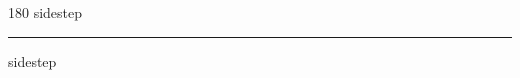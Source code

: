 
\begin{frame}
\begin{center}
\begin{turn}{180}
{\fontsize{2.5cm}{1em}\selectfont sidestep}
\end{turn}
\vspace{1em}\par  
\hrule
\vspace{1em}\par  
{\fontsize{2.5cm}{1em}\selectfont sidestep}
\end{center}
\end{frame}
